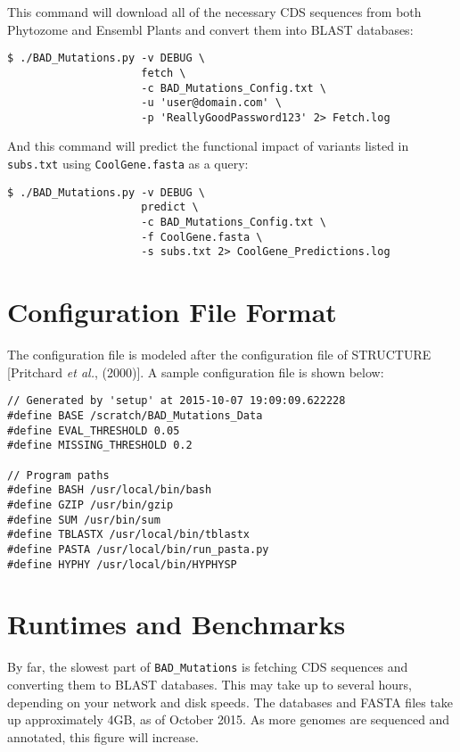 \documentclass[12pt]{article}
\newcommand{\BM}{\texttt{BAD\_Mutations} }
\begin{document}
\par This command will download all of the necessary CDS sequences from both
Phytozome and Ensembl Plants and convert them into BLAST databases:
\begin{Verbatim}[frame=single, fontsize=\small, rulecolor=\color{gray}]
$ ./BAD_Mutations.py -v DEBUG \
                     fetch \
                     -c BAD_Mutations_Config.txt \
                     -u 'user@domain.com' \
                     -p 'ReallyGoodPassword123' 2> Fetch.log
\end{Verbatim}

\par And this command will predict the functional impact of variants listed in
\texttt{subs.txt} using \texttt{CoolGene.fasta} as a query:
\begin{Verbatim}[frame=single, fontsize=\small, rulecolor=\color{gray}]
$ ./BAD_Mutations.py -v DEBUG \
                     predict \
                     -c BAD_Mutations_Config.txt \
                     -f CoolGene.fasta \
                     -s subs.txt 2> CoolGene_Predictions.log
\end{Verbatim}

\section*{Configuration File Format}
\par The configuration file is modeled after the configuration file of
STRUCTURE [Pritchard \textit{et al.}, (2000)]. A sample configuration file is
shown below:
\begin{Verbatim}[frame=single, fontsize=\small, rulecolor=\color{gray}]
// Generated by 'setup' at 2015-10-07 19:09:09.622228
#define BASE /scratch/BAD_Mutations_Data
#define EVAL_THRESHOLD 0.05
#define MISSING_THRESHOLD 0.2

// Program paths
#define BASH /usr/local/bin/bash
#define GZIP /usr/bin/gzip
#define SUM /usr/bin/sum
#define TBLASTX /usr/local/bin/tblastx
#define PASTA /usr/local/bin/run_pasta.py
#define HYPHY /usr/local/bin/HYPHYSP
\end{Verbatim}

\section*{Runtimes and Benchmarks}
\par By far, the slowest part of \BM is fetching CDS sequences and converting
them to BLAST databases. This may take up to several hours, depending on your
network and disk speeds. The databases and FASTA files take up approximately
4GB, as of October 2015. As more genomes are sequenced and annotated, this
figure will increase.
\end{document}

